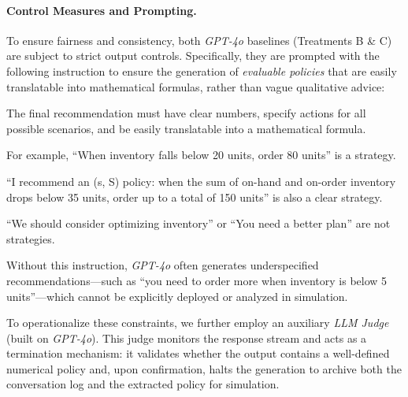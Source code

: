\paragraph{Control Measures and Prompting.}
To ensure fairness and consistency, both \emph{GPT-4o} baselines (Treatments B \& C) are subject to strict output controls. Specifically, they are prompted with the following instruction to ensure the generation of \textit{evaluable policies} that are easily translatable into mathematical formulas, rather than vague qualitative advice:
\begin{tcolorbox}
    \scriptsize   
The final recommendation must have clear numbers, specify actions for all possible scenarios, and be easily translatable into a mathematical formula.

For example, ``When inventory falls below 20 units, order 80 units'' is a strategy.

``I recommend an (s, S) policy: when the sum of on-hand and on-order inventory drops below 35 units, order up to a total of 150 units'' is also a clear strategy.

``We should consider optimizing inventory'' or ``You need a better plan'' are not strategies.
\end{tcolorbox}
Without this instruction, \emph{GPT-4o} often generates underspecified recommendations—such as ``you need to order more when inventory is below 5 units''—which cannot be explicitly deployed or analyzed in simulation.

To operationalize these constraints, we further employ an auxiliary \textit{LLM Judge} (built on \mbox{\emph{GPT-4o}}). This judge monitors the response stream and acts as a termination mechanism: it validates whether the output contains a well-defined numerical policy and, upon confirmation, halts the generation to archive both the conversation log and the extracted policy for simulation.



